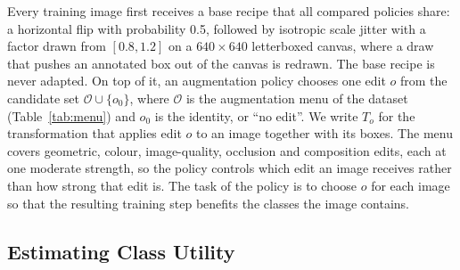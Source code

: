 Every training image first receives a base recipe that all compared policies share: a horizontal flip with probability 0.5, followed by isotropic scale jitter with a factor drawn from $[0.8,1.2]$ on a $640\times640$ letterboxed canvas, where a draw that pushes an annotated box out of the canvas is redrawn. The base recipe is never adapted. On top of it, an augmentation policy chooses one edit $o$ from the candidate set $\mathcal{O}\cup\{o_0\}$, where $\mathcal{O}$ is the augmentation menu of the dataset (Table~\ref{tab:menu}) and $o_0$ is the identity, or ``no edit''. We write $T_o$ for the transformation that applies edit $o$ to an image together with its boxes. The menu covers geometric, colour, image-quality, occlusion and composition edits, each at one moderate strength, so the policy controls which edit an image receives rather than how strong that edit is. The task of the policy is to choose $o$ for each image so that the resulting training step benefits the classes the image contains.

\subsection{Estimating Class Utility}
\label{sec:method_estimator}

